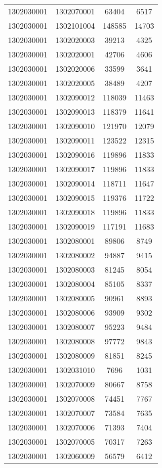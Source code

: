 \begin{longtable}[h]{llcc}
		1302030001 & 1302070001 & 63404 & 6517\\
		1302030001 & 1302101004 & 148585 & 14703\\
		1302030001 & 1302020003 & 39213 & 4325\\
		1302030001 & 1302020001 & 42706 & 4606\\
		1302030001 & 1302020006 & 33599 & 3641\\
		1302030001 & 1302020005 & 38489 & 4207\\
		1302030001 & 1302090012 & 118039 & 11463\\
		1302030001 & 1302090013 & 118379 & 11641\\
		1302030001 & 1302090010 & 121970 & 12079\\
		1302030001 & 1302090011 & 123522 & 12315\\
		1302030001 & 1302090016 & 119896 & 11833\\
		1302030001 & 1302090017 & 119896 & 11833\\
		1302030001 & 1302090014 & 118711 & 11647\\
		1302030001 & 1302090015 & 119376 & 11722\\
		1302030001 & 1302090018 & 119896 & 11833\\
		1302030001 & 1302090019 & 117191 & 11683\\
		1302030001 & 1302080001 & 89806 & 8749\\
		1302030001 & 1302080002 & 94887 & 9415\\
		1302030001 & 1302080003 & 81245 & 8054\\
		1302030001 & 1302080004 & 85105 & 8337\\
		1302030001 & 1302080005 & 90961 & 8893\\
		1302030001 & 1302080006 & 93909 & 9302\\
		1302030001 & 1302080007 & 95223 & 9484\\
		1302030001 & 1302080008 & 97772 & 9843\\
		1302030001 & 1302080009 & 81851 & 8245\\
		1302030001 & 1302031010 & 7696 & 1031\\
		1302030001 & 1302070009 & 80667 & 8758\\
		1302030001 & 1302070008 & 74451 & 7767\\
		1302030001 & 1302070007 & 73584 & 7635\\
		1302030001 & 1302070006 & 71393 & 7404\\
		1302030001 & 1302070005 & 70317 & 7263\\
		1302030001 & 1302060009 & 56579 & 6412\\

\end{longtable}
